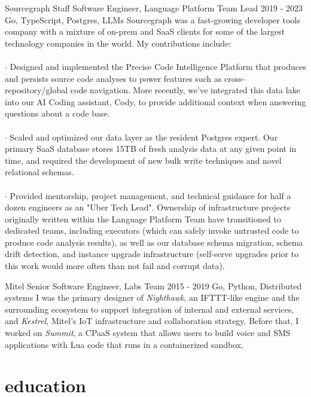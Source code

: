 \documentclass[]{clean-resume}
\begin{document}
\detailentry
  {Sourcegraph}
  {Staff Software Engineer, Language Platform Team Lead}
  {2019 - 2023}
  {Go, TypeScript, Postgres, LLMs}
  {
    Sourcegraph was a fast-growing developer tools company with a mixture of on-prem and SaaS clients for some of the largest technology companies in the world. My contributions include: \\\\
    \phantom{~~}\hspace{-1em}$\cdot$ Designed and implemented the Precise Code Intelligence Platform that produces and persists source code analyses to power features such as cross-repository/global code navigation. More recently, we've integrated this data lake into our AI Coding assistant, Cody, to provide additional context when answering questions about a code base. \\\\
    \phantom{~~}\hspace{-1em}$\cdot$ Scaled and optimized our data layer as the resident Postgres expert. Our primary SaaS database stores 15TB of fresh analysis data at any given point in time, and required the development of new bulk write techniques and novel relational schemas. \\\\
    \phantom{~~}\hspace{-1em}$\cdot$ Provided mentorship, project management, and technical guidance for half a dozen engineers as an "Uber Tech Lead". Ownership of infrastructure projects originally written within the Language Platform Team have transitioned to dedicated teams, including executors (which can safely invoke untrusted code to produce code analysis results), as well as our database schema migration, schema drift detection, and instance upgrade infrastructure (self-serve upgrades prior to this work would more often than not fail and corrupt data).
  }

\detailentry
  {Mitel}
  {Senior Software Engineer, Labs Team}
  {2015 - 2019}
  {Go, Python, Distributed systems}
  {
    I was the primary designer of \emph{Nighthawk}, an IFTTT-like engine and the surrounding ecosystem to support integration of internal and external services, and \emph{Kestrel}, Mitel's IoT infrastructure and collaboration strategy. Before that, I worked on \emph{Summit}, a CPaaS system that allows users to build voice and SMS applications with Lua code that runs in a containerized sandbox.
  }

\section{education}
\end{document}
